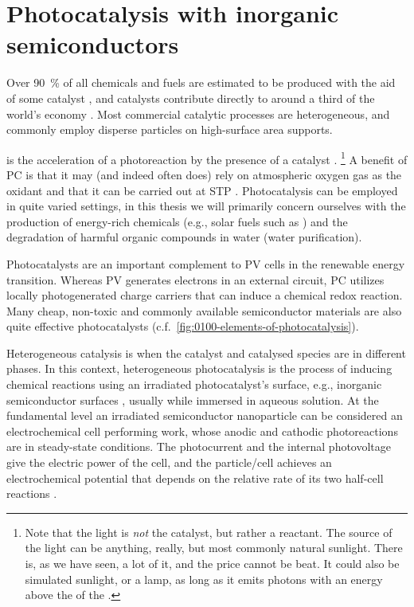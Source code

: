 \documentclass[draft,webedition,openright,titles,swedish,english]{LuaUUThesis}\usepackage[]{graphicx}\usepackage[]{xcolor}
\newcommand{\eg}{e.g.}
\newcommand{\cf}{c.f.}
\begin{document}
\section{Photocatalysis with inorganic semiconductors}
\label{intro:photocatalysis}

Over \qty{90}{\percent} of all chemicals and fuels are estimated to be produced
with the aid of some catalyst \cite{NilssonPingel2018}, and catalysts contribute directly
to around a third of the world's economy \cite{Ma2005}.
Most commercial catalytic processes are heterogeneous, and commonly employ disperse
particles on high-surface area supports.

 is the acceleration of a photoreaction
by the presence of a catalyst \cite{Mills1997,Suppan1994}.%
\footnote{%
   Note that the light is \emph{not} the catalyst, but rather a reactant.
   The source of the light can be anything, really, but most commonly
   natural sunlight. There is, as we have seen, a lot of it, and the
   price cannot be beat.
   It could also be simulated sunlight, or a lamp, as long as it emits
   photons with an energy above the  of
   the .}
A benefit of \gls{PC} is that it may (and indeed often does) rely
on atmospheric oxygen gas as the oxidant and that it can be carried out at
\gls{STP} \cite{Akyol2004}.
Photocatalysis can be employed in quite varied settings, in this thesis
we will primarily concern ourselves with the production of
energy-rich chemicals (\eg, solar fuels such as \hydrogen) and the degradation of
harmful organic compounds in water (water purification).

Photocatalysts are an important complement to \gls{PV} cells in the renewable
energy transition. Whereas \gls{PV} generates electrons in an external circuit,
\gls{PC} utilizes locally photogenerated charge carriers that can induce a chemical
redox reaction.
Many cheap, non-toxic and commonly available semiconductor materials are also
quite effective photocatalysts (\cf\ \cref{fig:0100-elements-of-photocatalysis}).

Heterogeneous catalysis is when the catalyst and catalysed species
are in different phases. In this context, heterogeneous photocatalysis is the process
of inducing chemical reactions using an irradiated photocatalyst's surface, \eg,
inorganic semiconductor surfaces \cite{Rajeshwar2015}, usually while immersed in
aqueous solution.
At the fundamental level an irradiated semiconductor nanoparticle can be considered
an electrochemical cell performing work, whose anodic and cathodic photoreactions
are in steady-state conditions. The photocurrent and the internal photovoltage
give the electric power of the cell, and the particle/cell achieves an
electrochemical potential that depends on the relative rate of its two half-cell
reactions \cite{Rajeshwar2015}.
\end{document}
